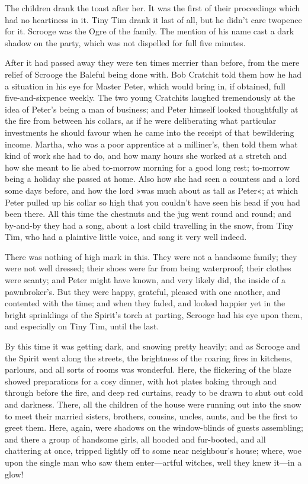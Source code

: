 The children drank the toast after her. It was the first of their proceedings which had no heartiness in it. Tiny Tim drank it last of all, but he didn't care twopence for it. Scrooge was the Ogre of the family. The mention of his name cast a dark shadow on the party, which was not dispelled for full five minutes.

After it had passed away they were ten times merrier than before, from the mere relief of Scrooge the Baleful being done with. Bob Cratchit told them how he had a situation in his eye for Master Peter, which would bring in, if obtained, full five-and-sixpence weekly. The two young Cratchits laughed tremendously at the idea of Peter's being a man of business; and Peter himself looked thoughtfully at the fire from between his collars, as if he were deliberating what particular investments he should favour when he came into the receipt of that bewildering income. Martha, who was a poor apprentice at a milliner's, then told them what kind of work she had to do, and how many hours she worked at a stretch and how she meant to lie abed to-morrow morning for a good long rest; to-morrow being a holiday she passed at home. Also how she had seen a countess and a lord some days before, and how the lord »was much about as tall as Peter«; at which Peter pulled up his collar so high that you couldn't have seen his head if you had been there. All this time the chestnuts and the jug went round and round; and by-and-by they had a song, about a lost child travelling in the snow, from Tiny Tim, who had a plaintive little voice, and sang it very well indeed.

There was nothing of high mark in this. They were not a handsome family; they were not well dressed; their shoes were far from being waterproof; their clothes were scanty; and Peter might have known, and very likely did, the inside of a pawnbroker's. But they were happy, grateful, pleased with one another, and contented with the time; and when they faded, and looked happier yet in the bright sprinklings of the Spirit's torch at parting, Scrooge had his eye upon them, and especially on Tiny Tim, until the last.

By this time it was getting dark, and snowing pretty heavily; and as Scrooge and the Spirit went along the streets, the brightness of the roaring fires in kitchens, parlours, and all sorts of rooms was wonderful. Here, the flickering of the blaze showed preparations for a cosy dinner, with hot plates baking through and through before the fire, and deep red curtains, ready to be drawn to shut out cold and darkness. There, all the children of the house were running out into the snow to meet their married sisters, brothers, cousins, uncles, aunts, and be the first to greet them. Here, again, were shadows on the window-blinds of guests assembling; and there a group of handsome girls, all hooded and fur-booted, and all chattering at once, tripped lightly off to some near neighbour's house; where, woe upon the single man who saw them enter---artful witches, well they knew it---in a glow!

